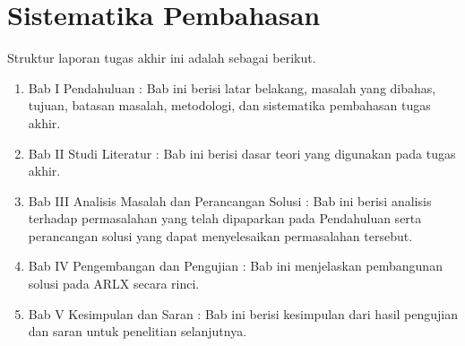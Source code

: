 \section{Sistematika Pembahasan}

Struktur laporan tugas akhir ini adalah sebagai berikut.

\begin{enumerate}

    \item Bab I Pendahuluan : Bab ini berisi latar belakang, masalah yang dibahas, tujuan,
    	    batasan masalah, metodologi, dan sistematika pembahasan tugas akhir.

    \item Bab II Studi Literatur : Bab ini berisi dasar teori yang digunakan pada tugas akhir.

    \item Bab III Analisis Masalah dan Perancangan Solusi : Bab ini berisi analisis terhadap
    	    permasalahan yang telah dipaparkan pada Pendahuluan serta perancangan solusi yang
    	    dapat menyelesaikan permasalahan tersebut.

    \item Bab IV Pengembangan dan Pengujian : Bab ini menjelaskan pembangunan solusi pada ARLX
    	    secara rinci.

    \item Bab V Kesimpulan dan Saran : Bab ini berisi kesimpulan dari hasil pengujian dan saran
    	    untuk penelitian selanjutnya.

\end{enumerate}

